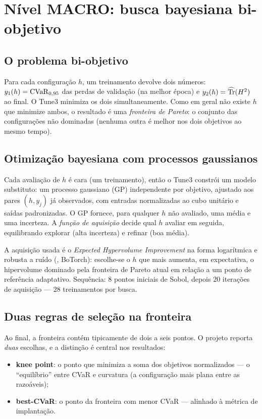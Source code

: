 \section{Nível MACRO: busca bayesiana bi-objetivo}\label{sec:macro}

\subsection{O problema bi-objetivo}
Para cada configuração $h$, um treinamento devolve dois números: $y_1(h)=\operatorname{CVaR}_{0{,}95}$ das perdas de validação (na melhor época) e $y_2(h)=\widehat{\operatorname{Tr}}(H^2)$ ao final. O Tune3 minimiza os dois simultaneamente. Como em geral não existe $h$ que minimize ambos, o resultado é uma \emph{fronteira de Pareto}: o conjunto das configurações não dominadas (nenhuma outra é melhor nos dois objetivos ao mesmo tempo).

\subsection{Otimização bayesiana com processos gaussianos}
Cada avaliação de $h$ é cara (um treinamento), então o Tune3 constrói um modelo substituto: um processo gaussiano (GP) independente por objetivo, ajustado aos pares $(h,y_j)$ já observados, com entradas normalizadas ao cubo unitário e saídas padronizadas. O GP fornece, para qualquer $h$ não avaliado, uma média e uma incerteza. A \emph{função de aquisição} decide qual $h$ avaliar em seguida, equilibrando explorar (alta incerteza) e refinar (boa média).

A aquisição usada é o \emph{Expected Hypervolume Improvement} na forma logarítmica e robusta a ruído (, BoTorch): escolhe-se o $h$ que mais aumenta, em expectativa, o hipervolume dominado pela fronteira de Pareto atual em relação a um ponto de referência adaptativo. Sequência: $8$ pontos iniciais de Sobol, depois $20$ iterações de aquisição --- $28$ treinamentos por busca.

\subsection{Duas regras de seleção na fronteira}
Ao final, a fronteira contém tipicamente de dois a seis pontos. O projeto reporta \emph{duas} escolhas, e a distinção é central nos resultados:
\begin{itemize}
\item \textbf{knee point}: o ponto que minimiza a soma dos objetivos normalizados --- o ``equilíbrio'' entre CVaR e curvatura (a configuração mais plana entre as razoáveis);
\item \textbf{best-CVaR}: o ponto da fronteira com menor CVaR --- alinhado à métrica de implantação.
\end{itemize}

